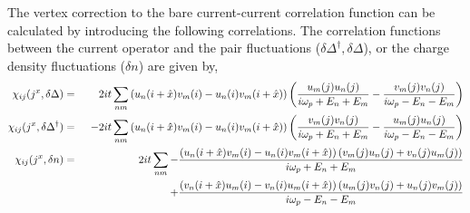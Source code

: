 \documentclass[Colective.tex]{revtex4-1}
\begin{document}
The vertex correction to the bare current-current correlation function can be calculated by introducing the following correlations. The correlation functions between the current operator and the pair fluctuations ($\delta\Delta^\dagger,\delta\Delta$), or the charge density fluctuations ($\delta n$) are given by,
\begin{eqnarray}
\chi_{ij}(j^x,\delta\Delta) &=& 2it \sum_{nm} 
{\left(u_n(i+\hat x)v_m(i) - u_n(i)v_m(i+\hat x)\right)} \left( {u_{m}(j)u_{n}(j) \over i\omega_p +E_n+E_m} - {v_{m}(j)v_{n}(j) \over i\omega_p -E_n-E_m} \right) \\
\chi_{ij}(j^x,\delta\Delta^\dagger) &=& -2it \sum_{nm} {\left(u_n(i+\hat x)v_m(i)-u_n(i)v_m(i+\hat x)\right)} \left( { v_{m}(j)v_{n}(j) \over i\omega_p +E_n+E_m} - {u_{m}(j)u_{n}(j) \over i\omega_p -E_n-E_m} \right) \\
\chi_{ij}(j^x,\delta n) &=&  2it \sum_{nm} 
-{\left(u_n(i+\hat x)v_m(i)-u_n(i)v_m(i+\hat x)\right) \left(v_{m}(j)u_{n}(j) + v_{n}(j)u_{m}(j)\right) \over i\omega_p +E_n+E_m} \nonumber\\
&& ~~~~~~~~~~~~~~~~~~~~~~~~ + {\left(v_n(i+\hat x)u_m(i)-v_n(i)u_m(i+\hat x)\right) \left(u_{m}(j)v_{n}(j)+u_{n}(j)v_{m}(j)\right)  \over i\omega_p-E_n-E_m}
\end{eqnarray}
\end{document}
